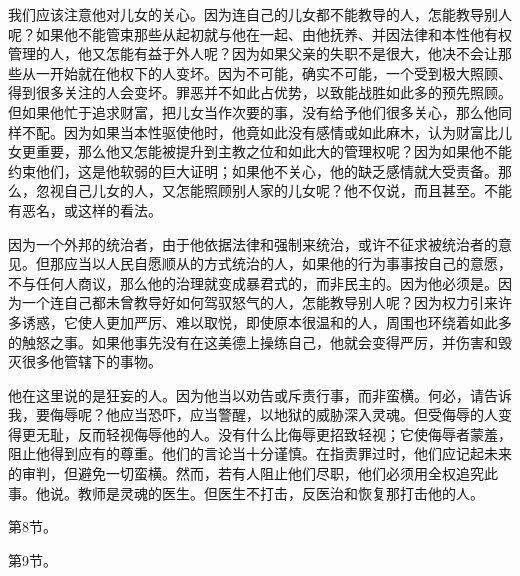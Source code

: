 \par

我们应该注意他对儿女的关心。因为连自己的儿女都不能教导的人，怎能教导别人呢？如果他不能管束那些从起初就与他在一起、由他抚养、并因法律和本性他有权管理的人，他又怎能有益于外人呢？因为如果父亲的失职不是很大，他决不会让那些从一开始就在他权下的人变坏。因为不可能，确实不可能，一个受到极大照顾、得到很多关注的人会变坏。罪恶并不如此占优势，以致能战胜如此多的预先照顾。但如果他忙于追求财富，把儿女当作次要的事，没有给予他们很多关心，那么他同样不配。因为如果当本性驱使他时，他竟如此没有感情或如此麻木，认为财富比儿女更重要，那么他又怎能被提升到主教之位和如此大的管理权呢？因为如果他不能约束他们，这是他软弱的巨大证明；如果他不关心，他的缺乏感情就大受责备。那么，忽视自己儿女的人，又怎能照顾别人家的儿女呢？他不仅说，而且甚至。不能有恶名，或这样的看法。\par

\par

因为一个外邦的统治者，由于他依据法律和强制来统治，或许不征求被统治者的意见。但那应当以人民自愿顺从的方式统治的人，如果他的行为事事按自己的意愿，不与任何人商议，那么他的治理就变成暴君式的，而非民主的。因为他必须是。因为一个连自己都未曾教导好如何驾驭怒气的人，怎能教导别人呢？因为权力引来许多诱惑，它使人更加严厉、难以取悦，即使原本很温和的人，周围也环绕着如此多的触怒之事。如果他事先没有在这美德上操练自己，他就会变得严厉，并伤害和毁灭很多他管辖下的事物。\par

他在这里说的是狂妄的人。因为他当以劝告或斥责行事，而非蛮横。何必，请告诉我，要侮辱呢？他应当恐吓，应当警醒，以地狱的威胁深入灵魂。但受侮辱的人变得更无耻，反而轻视侮辱他的人。没有什么比侮辱更招致轻视；它使侮辱者蒙羞，阻止他得到应有的尊重。他们的言论当十分谨慎。在指责罪过时，他们应记起未来的审判，但避免一切蛮横。然而，若有人阻止他们尽职，他们必须用全权追究此事。他说。教师是灵魂的医生。但医生不打击，反医治和恢复那打击他的人。\par

第8节。\par

第9节。\par

